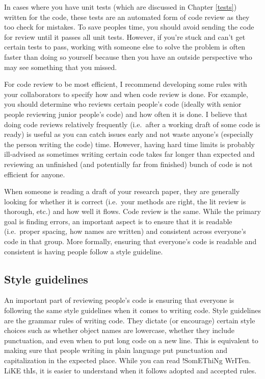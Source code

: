 \documentclass[
]{krantz}
\begin{document}
In cases where you have unit tests (which are discussed in
Chapter \ref{tests}) written for the code, these tests are
an automated form of code review as they too check for
mistakes. To save peoples time, you should avoid sending the
code for review until it passes all unit tests. However, if
you're stuck and can't get certain tests to pass, working
with someone else to solve the problem is often faster than
doing so yourself because then you have an outside
perspective who may see something that you missed.

For code review to be most efficient, I recommend developing
some rules with your collaborators to specify how and when
code review is done. For example, you should determine who
reviews certain people's code (ideally with senior people
reviewing junior people's code) and how often it is done. I
believe that doing code reviews relatively frequently
(i.e.~after a working draft of some code is ready) is useful
as you can catch issues early and not waste anyone's
(especially the person writing the code) time. However,
having hard time limits is probably ill-advised as sometimes
writing certain code takes far longer than expected and
reviewing an unfinished (and potentially far from finished)
bunch of code is not efficient for anyone.

When someone is reading a draft of your research paper, they
are generally looking for whether it is correct (i.e.~your
methods are right, the lit review is thorough, etc.) and how
well it flows. Code review is the same. While the primary
goal is finding errors, an important aspect is to ensure
that it is readable (i.e.~proper spacing, how names are
written) and consistent across everyone's code in that
group. More formally, ensuring that everyone's code is
readable and consistent is having people follow a style
guideline.

\hypertarget{style-guidelines}{%
\subsection{Style guidelines}\label{style-guidelines}}

An important part of reviewing people's code is ensuring
that everyone is following the same style guidelines when it
comes to writing code. Style guidelines are the grammar
rules of writing code. They dictate (or encourage) certain
style choices such as whether object names are lowercase,
whether they include punctuation, and even when to put long
code on a new line. This is equivalent to making sure that
people writing in plain language put punctuation and
capitalization in the expected place. While you can read
!SomEThiNg WrITen. LiKE thIs, it is easier to understand
when it follows adopted and accepted rules.
\end{document}
